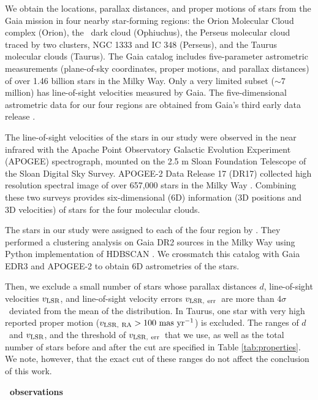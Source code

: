 We obtain the locations, parallax distances, and proper motions of stars from the Gaia mission \citep{collaboration_gaia_2016} in four nearby star-forming regions: the Orion Molecular Cloud complex (Orion), the \rophi~dark cloud (Ophiuchus), the Perseus molecular cloud traced by two clusters, NGC 1333 and IC 348 (Perseus), and the Taurus molecular clouds (Taurus). The Gaia catalog includes five-parameter astrometric measurements (plane-of-sky coordinates, proper motions, and parallax distances) of over 1.46 billion stars in the Milky Way. Only a very limited subset ($\sim 7$ million) has line-of-sight velocities measured by Gaia. The five-dimensional astrometric data for our four regions are obtained from Gaia's third early data release \citep[EDR3;][]{brown_gaia_2021}. 

The line-of-sight velocities of the stars in our study were observed in the near infrared with the Apache Point Observatory Galactic Evolution Experiment (APOGEE) spectrograph, mounted on the 2.5 m Sloan Foundation Telescope of the Sloan Digital Sky Survey. APOGEE-2 Data Release 17 (DR17) collected high resolution spectral image of over 657,000 stars in the Milky Way \citep{gunn_25_2006,blanton_sloan_2017,abdurrouf_seventeenth_2022}. Combining these two surveys provides six-dimensional (6D) information (3D positions and 3D velocities) of stars for the four molecular clouds.

The stars in our study were assigned to each of the four region by \citet{kounkel_untangling_2019}. They performed a clustering analysis on Gaia DR2 sources in the Milky Way using Python implementation of HDBSCAN \citep[Hierarchical Density-Based Spatial Clustering of Applications with Noise;][]{mcinnes_hdbscan_2017}. We crossmatch this catalog with Gaia EDR3 and APOGEE-2 to obtain 6D astrometries of the stars. 

Then, we exclude a small number of stars whose parallax distances $d$, line-of-sight velocities $v_{\rm LSR}$, and line-of-sight velocity errors $v_{\rm LSR,~err}$~are more than 4$\sigma$~deviated from the mean of the distribution. In Taurus, one star with very high reported proper motion ($v_{\rm LSR,~RA} > 100\mathrm{~mas~yr}^{-1}$) is excluded.
The ranges of $d$~and $v_{\rm LSR}$, and the threshold of $v_{\rm LSR,~err}$~that we use, as well as the total number of stars before and after the cut are specified in Table \ref{tab:properties}. We note, however, that the exact cut of these ranges do not affect the conclusion of this work.

\centerline{\textbf{\halpha~observations}}

